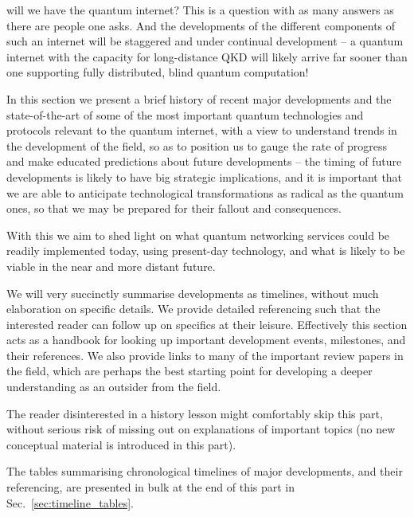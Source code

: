 %
%

\startnormtable

 will we have the quantum internet? This is a question with as many answers as there are people one asks. And the developments of the different components of such an internet will be staggered and under continual development -- a quantum internet with the capacity for long-distance QKD will likely arrive far sooner than one supporting fully distributed, blind quantum computation!

In this section we present a brief history of recent major developments and the state-of-the-art of some of the most important quantum technologies and protocols relevant to the quantum internet, with a view to understand trends in the development of the field, so as to position us to gauge the rate of progress and make educated predictions about future developments -- the timing of future developments is likely to have big strategic implications, and it is important that we are able to anticipate technological transformations as radical as the quantum ones, so that we may be prepared for their fallout and consequences.

With this we aim to shed light on what quantum networking services could be readily implemented today, using present-day technology, and what is likely to be viable in the near and more distant future.

We will very succinctly summarise developments as timelines, without much elaboration on specific details. We provide detailed referencing such that the interested reader can follow up on specifics at their leisure. Effectively this section acts as a handbook for looking up important development events, milestones, and their references. We also provide links to many of the important review papers in the field, which are perhaps the best starting point for developing a deeper understanding as an outsider from the field.

The reader disinterested in a history lesson might comfortably skip this part, without serious risk of missing out on explanations of important topics (no new conceptual material is introduced in this part).

The tables summarising chronological timelines of major developments, and their referencing, are presented in bulk at the end of this part in Sec.~\ref{sec:timeline_tables}.

%
%

